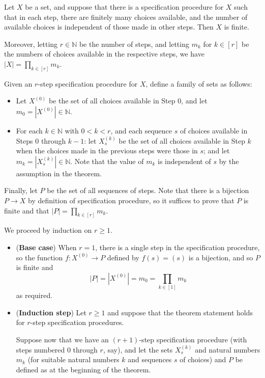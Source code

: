 \begin{theorem}
\label{thmMultiplicationPrincipleGeneral}
Let $X$ be a set, and suppose that there is a specification procedure for $X$ such that in each step, there are finitely many choices available, and the number of available choices is independent of those made in other steps. Then $X$ is finite.

Moreover, letting $r \in \mathbb{N}$ be the number of steps, and letting $m_k$ for $k \in [r]$ be the numbers of choices available in the respective steps, we have $|X| = \prod_{k \in [r]} m_k$.
\end{theorem}

\begin{cproof}
Given an $r$-step specification procedure for $X$, define a family of sets as follows:
\begin{itemize}
\item Let $X^{(0)}$ be the set of all choices available in Step $0$, and let $m_0 = |X^{(0)}| \in \mathbb{N}$.
\item For each $k \in \mathbb{N}$ with $0 < k < r$, and each sequence $s$ of choices available in Steps $0$ through $k-1$: let $X^{(k)}_s$ be the set of all choices available in Step $k$ when the choices made in the previous steps were those in $s$; and let $m_k = |X^{(k)}_s| \in \mathbb{N}$. Note that the value of $m_k$ is independent of $s$ by the assumption in the theorem.
\end{itemize}
Finally, let $P$ be the set of all sequences of steps. Note that there is a bijection $P \to X$ by definition of specification procedure, so it suffices to prove that $P$ is finite and that $|P| = \displaystyle \prod_{k \in [r]} m_k$.

We proceed by induction on $r \ge 1$.
\begin{itemize}
\item (\textbf{Base case}) When $r=1$, there is a single step in the specification procedure, so the function $f : X^{(0)} \to P$ defined by $f(s) = (s)$ is a bijection, and so $P$ is finite and
\[ |P| = |X^{(0)}| = m_0 = \prod_{k \in [1]} m_k \]
as required.

\item (\textbf{Induction step}) Let $r \ge 1$ and suppose that the theorem statement holds for $r$-step specification procedures.

Suppose now that we have an $(r+1)$-step specification procedure (with steps numbered $0$ through $r$, say), and let the sets $X^{(k)}_s$ and natural numbers $m_k$ (for suitable natural numbers $k$ and sequences $s$ of choices) and $P$ be defined as at the beginning of the theorem.


\end{itemize}
\end{cproof}
